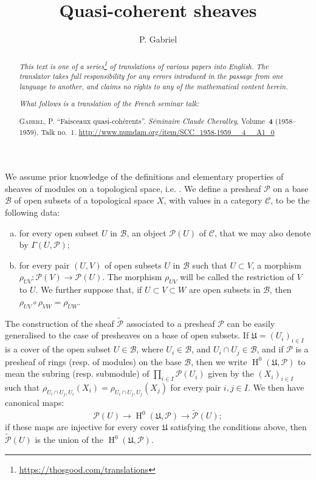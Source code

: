 \documentclass{article}
\title{Quasi-coherent sheaves}
\author{P. Gabriel}
\date{}
\newcommand{\doctype}{French seminar talk}
\newcommand{\origcit}{%
  \textsc{Gabriel, P.}
  ``Faisceaux quasi-coh\'{e}rents''.
  \emph{S\'{e}minaire Claude Chevalley}, Volume~\textbf{4} (1958--1959), Talk no.~1.
  {\url{http://www.numdam.org/item/SCC_1958-1959__4__A1_0}}%
}
\newcommand{\scr}[1]{{\mathscr{#1}}}
\renewcommand{\cal}[1]{{\mathcal{#1}}}
\DeclareMathOperator{\HH}{H}
\newcommand{\oldpage}[1]{\marginpar{\footnotesize$\Big\vert$ \textit{p.~#1}}}
\begin{document}
\maketitle
\thispagestyle{fancy}

\renewcommand{\abstractname}{Translator's note.}

\begin{abstract}
  \renewcommand*{\thefootnote}{\fnsymbol{footnote}}
  \emph{This text is one of a series\footnote{\url{https://thosgood.com/translations}} of translations of various papers into English.}
  \emph{The translator takes full responsibility for any errors introduced in the passage from one language to another, and claims no rights to any of the mathematical content herein.}

  \medskip
  
  \emph{What follows is a translation of the \doctype:}

  \medskip\noindent
  \origcit
\end{abstract}

\setcounter{footnote}{0}

\tableofcontents
\bigskip



\oldpage{1-01}
We assume prior knowledge of the definitions and elementary properties of sheaves of modules on a topological space, i.e. \cite[chapitre~I, \S1; chapitre~II, \S\S1--2]{2}.
We define a presheaf $\scr{P}$ on a base $\mathscr{B}$ of open subsets of a topological space $X$, with values in a category $\cal{C}$, to be the following data:
\begin{enumerate}[(a)]
  \item for every open subset $U$ in $\mathscr{B}$, an object $\scr{P}(U)$ of $\cal{C}$, that we may also denote by $\Gamma(U,\scr{P})$;
  \item for every pair $(U,V)$ of open subsets $U$ in $\mathscr{B}$ such that $U\subset V$, a morphism $\rho_{UV}\colon\scr{P}(V)\to\scr{P}(U)$.
    The morphism $\rho_{UV}$ will be called the restriction of $V$ to $U$.
    We further suppose that, if $U\subset V\subset W$ are open subsets in $\mathscr{B}$, then $\rho_{UV}\circ\rho_{VW}=\rho_{UW}$.
\end{enumerate}

The construction of the sheaf $\widetilde{\scr{P}}$ associated to a presheaf $\scr{P}$ can be easily generalised to the case of presheaves on a base of open subsets.
If $\mathfrak{U}=(U_i)_{i\in I}$ is a cover of the open subset $U\in\mathscr{B}$, where $U_i\in\mathscr{B}$, and $U_i\cap U_j\in\mathscr{B}$, and if $\scr{P}$ is a presheaf of rings (resp. of modules) on the base $\mathscr{B}$, then we write $\HH^0(\mathfrak{U},\scr{P})$ to mean the subring (resp. submodule) of $\prod_{i\in I}\scr{P}(U_i)$ given by the $(X_i)_{i\in I}$ such that $\rho_{U_i\cap U_j,U_i}(X_i) = \rho_{U_i\cap U_j,U_j}(X_j)$ for every pair $i,j\in I$.
We then have canonical maps:
\[
  \scr{P}(U) \to \HH^0(\mathfrak{U},\scr{P}) \to \widetilde{\scr{P}}(U);
\]
if these maps are injective for every cover $\mathfrak{U}$ satisfying the conditions above, then $\widetilde{\scr{P}}(U)$ is the union of the $\HH^0(\mathfrak{U},\scr{P})$.
\end{document}
